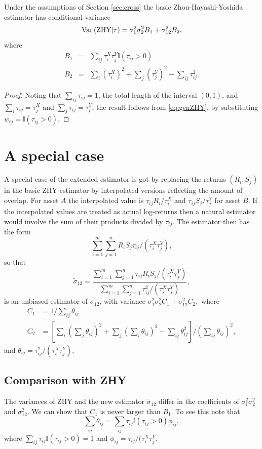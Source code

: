 \begin{corollary}
\label{thm:basicHY}
Under the assumptions of Section \ref{sec:cross} the basic Zhou-Hayashi-Yoshida estimator has conditional variance
$$\text{\rm Var}\, (\text{\rm ZHY} | \tau) = \sigma^2_1 \sigma^2_2 B_1 + \sigma^2_{12} B_2,$$
where 
\begin{equation}\label{eq:varBasicHY}
\begin{array}{lll}
B_1 &=& \sum_{ij} \tau_i^X \tau_j^Y \mathbb{I}(\tau_{ij} >0)  \\ 
B_2 &=& \sum_i (\tau^X_i)^2 + \sum_j(\tau^Y_j)^2 - \sum_{ij} \tau_{ij}^2.
\end{array}
\end{equation}
\end{corollary} 
\begin{proof}
Noting that $\sum_{ij} \tau_{ij} = 1$, the total length of the interval $(0,1)$, and $\sum_i \tau_{ij} = \tau^X_j$ and $\sum_j \tau_{ij} = \tau^Y_i$, the result follows from \eqref{eq:genZHY}, by substituting $w_{ij} = \mathbb{I}(\tau_{ij} > 0)$.
\end{proof}

\section{A special  case}\label{sec:specialcase}
A special case of the extended estimator is got by replacing the returns $(R_i, S_j)$ in the basic ZHY estimator by interpolated versions reflecting the amount of overlap.  For asset $A$ the interpolated  value is $\tau_{ij} R_i/\tau^X_i$ and $\tau_{ij} S_j/\tau^Y_j$ for asset $B$. If the interpolated values are treated as actual log-returns then a natural estimator would involve the sum of their products divided by $\tau_{ij}$. The estimator then has the form
$$\sum_{i=1}^{m} \sum_{j=1}^{n}   R_i S_j \tau_{ij}/(\tau^X_i \tau^Y_j),$$
so that 
$$\tilde{\sigma}_{12} = \frac{\sum_{i=1}^{m} \sum_{j=1}^{n}  \tau_{ij} R_i S_j/(\tau^X_i \tau^Y_j) }{\sum_{i=1}^{m} \sum_{j=1}^{n} \tau^2_{ij}/(\tau^X_i \tau^Y_j)},$$ 
is an unbiased estimator of $\sigma_{12}$, with variance $\sigma^2_1 \sigma^2_2 C_1 + \sigma^2_{12} C_2,$
where 
\begin{align*}
C_1 &= 1/\sum_{ij} \theta_{ij}\\
C_2 &= \left[\sum_i (\sum_j \theta_{ij})^2 + \sum_j(\sum_i \theta_{ij})^2 - \sum_{ij} \theta_{ij}^2 \right]\bigg/\left(\sum_{ij} \theta_{ij} \right)^2,
\end{align*}
and $\theta_{ij} = \tau^2_{ij}/(\tau_i^X \tau^Y_j)$.
\subsection{Comparison with ZHY}\label{sec:noisefree}
The variances of ZHY and the new estimator $\tilde{\sigma}_{12}$ differ in the coefficients of $\sigma^2_1 \sigma^2_2$ and $\sigma^2_{12}$.  We can show that $C_1$ is never larger than $B_1$. To see this note that 
$$ \sum_{ij}\theta_{ij} = \sum_{ij} \tau_{ij} \mathbb{I}(\tau_{ij} > 0) \phi_{ij},$$
where $\sum_{ij}\tau_{ij} \mathbb{I}(\tau_{ij} > 0) = 1$ and $ \phi_{ij} = \tau_{ij}/(\tau_i^X \tau^Y_j.$  

